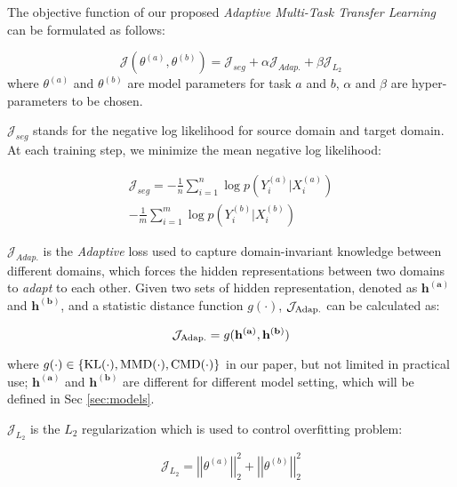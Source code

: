 The objective function of our proposed \textit{Adaptive Multi-Task Transfer Learning} can be formulated as follows:

\small
\begin{equation}\label{eq:objective}
\mathcal{J}(\theta^{(a)}, \theta^{(b)}) = \mathcal{J}_{seg} + \alpha\mathcal{J}_{Adap.} + \beta\mathcal{J}_{L_2}
\end{equation}
\normalsize
where $\theta^{(a)}$ and $\theta^{(b)}$ are model parameters for task $a$ and $b$, $\alpha$ and $\beta$ are hyper-parameters to be chosen.

$\mathcal{J}_{seg}$ stands for the negative log likelihood for source domain and target domain. At each training step, we minimize the mean negative log likelihood:

\small
\begin{equation}
\begin{aligned}
\mathcal{J}_{seg} = -\frac{1}{n}\sum_{i=1}^n\log p(Y_i^{(a)}|X_i^{(a)}) \\ -\frac{1}{m}\sum_{i=1}^m\log p(Y_i^{(b)}|X_i^{(b)})
\end{aligned}
\end{equation}
\normalsize

$\mathcal{J}_{Adap.}$ is the \textit{Adaptive} loss used to capture domain-invariant knowledge between different domains, which forces the hidden representations between two domains to \textit{adapt} to each other. Given two sets of hidden representation, denoted as $\mathbf{h^{(a)}}$ and $\mathbf{h^{(b)}}$, and a statistic distance function $g(\cdot)$, $\mathcal{J}_{\textnormal{Adap.}}$ can be calculated as:

\small
\begin{equation}\label{eq:Adap}
\mathcal{J}_{\textnormal{Adap.}} = g(\mathbf{h^{(a)}}, \mathbf{h^{(b)}})
\end{equation}
\normalsize

\noindent where $g(\cdot) \in \{\textnormal{KL}(\cdot), \textnormal{MMD}(\cdot), \textnormal{CMD}(\cdot)\}$ in our paper, but not limited in practical use; $\mathbf{h^{(a)}}$ and $\mathbf{h^{(b)}}$ are different for different model setting, which will be defined in Sec \ref{sec:models}.

$\mathcal{J}_{L_2}$ is the $L_2$ regularization which is used to control overfitting problem:

\small
\begin{equation}
\mathcal{J}_{L_2} = \left|\left|\theta^{(a)}\right|\right|^2_2 + \left|\left|\theta^{(b)}\right|\right|^2_2
\end{equation}
\normalsize


